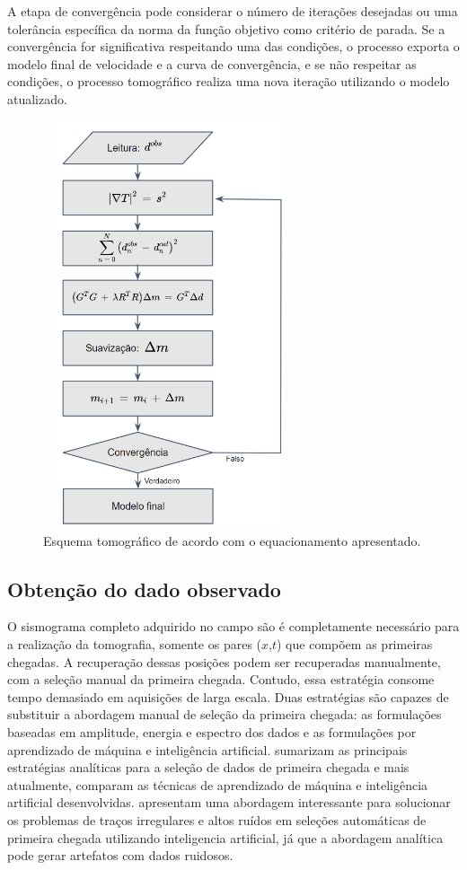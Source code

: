 A etapa de convergência pode considerar o número de iterações desejadas ou uma tolerância específica da norma da função objetivo como critério de parada. Se a convergência for significativa respeitando uma das condições, o processo exporta o modelo final de velocidade e a curva de convergência, e se não respeitar as condições, o processo tomográfico realiza uma nova iteração utilizando o modelo atualizado.      

\begin{figure}[H]
	\centering
	\includegraphics[width=7.5cm, height=12cm]{Imgs/RevisaoBibliografica/tomography_chart.png}
	\caption{Esquema tomográfico de acordo com o equacionamento apresentado.}
	\label{tomography_chart}
\end{figure}

\subsection*{Obtenção do dado observado}

O sismograma completo adquirido no campo são é completamente necessário para a realização da tomografia, somente os pares ($x$,$t$) que compõem as primeiras chegadas. A recuperação dessas posições podem ser recuperadas manualmente, com a seleção manual da primeira chegada. Contudo, essa estratégia consome tempo demasiado em aquisições de larga escala. Duas estratégias são capazes de substituir a abordagem manual de seleção da primeira chegada: as formulações baseadas em amplitude, energia e espectro dos dados e as formulações por aprendizado de máquina e inteligência artificial.  sumarizam as principais estratégias analíticas para a seleção de dados de primeira chegada e mais atualmente,  comparam as técnicas de aprendizado de máquina e inteligência artificial desenvolvidas.  apresentam uma abordagem interessante para solucionar os problemas de traços irregulares e altos ruídos em seleções automáticas de primeira chegada utilizando inteligencia artificial, já que a abordagem analítica pode gerar artefatos com dados ruidosos. 

